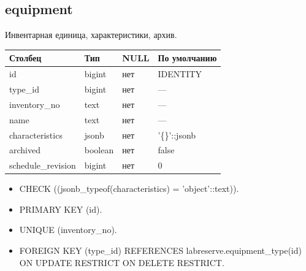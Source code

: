 \par\noindent\begin{minipage}{\linewidth}
\subsection{equipment}
Инвентарная единица, характеристики, архив.\par\smallskip\noindent
\begin{tabular}{p{}p{}p{}p{}}
\toprule Столбец & Тип & NULL & По умолчанию \\ \midrule
id & bigint & нет & IDENTITY \\
type\_\allowbreak{}id & bigint & нет & — \\
inventory\_\allowbreak{}no & text & нет & — \\
name & text & нет & — \\
characteristics & jsonb & нет & '\{\}'::jsonb \\
archived & boolean & нет & false \\
schedule\_\allowbreak{}revision & bigint & нет & 0 \\
\bottomrule\end{tabular}\end{minipage}\par
\begin{itemize}
\item CHECK ((jsonb\_\allowbreak{}typeof(characteristics) = 'object'::text)).
\item PRIMARY KEY (id).
\item UNIQUE (inventory\_\allowbreak{}no).
\item FOREIGN KEY (type\_\allowbreak{}id) REFERENCES labreserve.equipment\_\allowbreak{}type(id) ON UPDATE RESTRICT ON DELETE RESTRICT.
\end{itemize}
